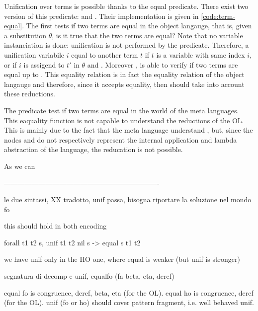 \documentclass[sigconf,natbib=false]{acmart}
\begin{document}
Unification over terms is possible thanks to the equal predicate. There exist
two version of this predicate: \eqfo and \eqho. Their implementation is given in
\cref{code:term-equal}. The first tests if two terms are equal in the object
langauge, that is, given a substitution $\theta$, is it true that the two terms
are equal? Note that no variable instanciation is done: unification is not
performed by the  predicate. Therefore, a unification variabile
$i$ equal to another term $t$ if $t$ is a variable with same index $i$, or if
$i$ is assigend to $t'$ in $\theta$ and . Moreover
\eqfo, is able to verify if two terms are equal up to \etabeta. This equality
relation is in fact the equality relation of the object langauge and therefore,
since it accepts \etabeta equality, then \eqfo should take into account these
reductions.

The \eqho predicate test if two terms are equal in the world of the meta
languages. This eaquality function is not capable to understand the \etabeta
reductions of the OL. This is mainly due to the fact that the meta language 
understand \etabeta, but, since the nodes  and  do
not respectively represent the internal application and lambda abstraction
of the language, the \etabeta reducation is not possible.

As we can






-------------------------------------------------------------------




le due sintassi, XX tradotto, unif passa, bisogna riportare la soluzione
nel mondo fo

this should hold in both encoding
\begin{elpicode}
forall t1 t2 s, unif t1 t2 nil s -> equal s t1 t2
\end{elpicode}
we have unif only in the HO one, where equal is
weaker (but unif is stronger)

segnatura di decomp e unif, equalfo (fa beta, eta, deref)

\noindent

equal fo is congruence, deref, beta, eta (for the OL).
equal ho is congruence, deref (for the OL).
unif (fo or ho) should cover pattern fragment, i.e. well behaved unif.
\end{document}
